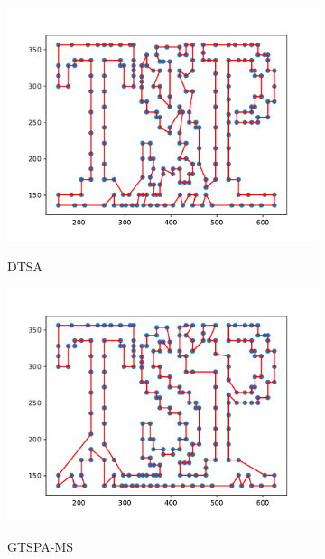 \documentclass[12pt]{article}
\theoremstyle{plain}
\theoremstyle{definition}
\theoremstyle{remark}
\begin{document}
\begin{figure}[ht]
	\centering
	\begin{subfigure}{.5\textwidth}
		\centering
		\includegraphics[scale = 0.44]{../../Implementation/gen/best_path_dtsa_tsp225}
		\label{fig:best_path_dtsa_tsp225}
		\caption{DTSA}
	\end{subfigure}%
	\begin{subfigure}{.5\textwidth}
		\centering
		\includegraphics[scale = 0.44]{../../Implementation/gen/best_path_gtspams_tsp225}
		\label{fig:best_path_gtspams_tsp225}
		\caption{GTSPA-MS}
	\end{subfigure}
	\begin{subfigure}{.5\textwidth}
		\centering

\end{subfigure}
\end{figure}
\end{document}
